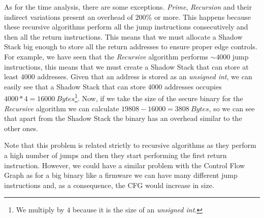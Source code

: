 As for the time analysis, there are some exceptions. \textit{Prime}, \textit{Recursion}
and their indirect variations present an overhead of $200\%$ or more. This happens
because these recursive algorithms perform all the jump instructions consecutively
and then all the return instructions. This means that we must allocate a Shadow
Stack big enough to store all the return addresses to ensure proper edge
controls. For example, we have seen that the \textit{Recursive} algorithm performs
$\sim 4000$ jump instructions, this means that we must create a Shadow Stack
that can store at least $4000$ addresses. Given that an address is stored as an \textit{unsigned
int}, we can easily see that a Shadow Stack that can store $4000$ addresses occupies
$4000*4 = 16000 \ \textit{Bytes}$\footnote{We multiply by $4$ because it is the
size of an \textit{unsigned int}.}. Now, if we take the size of the secure
binary for the \textit{Recursive} algorithm we can calculate $19808 - 16000 = 380
8 \ \textit{Bytes}$, so we can see that apart from the Shadow Stack the binary
has an overhead similar to the other ones.

Note that this problem is related strictly to recursive algorithms as they
perform a high number of jumps and then they start performing the first return
instruction. However, we could have a similar problem with the Control Flow
Graph as for a big binary like a firmware we can have many different jump
instructions and, as a consequence, the CFG would increase in size.

